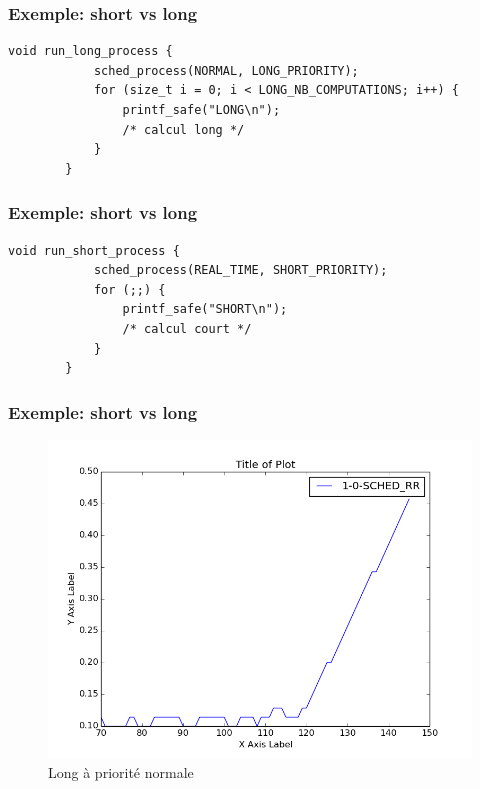\documentclass{beamer}
\begin{document}
\begin{frame}[fragile]
    \frametitle{Exemple: short vs long}

    \begin{lstlisting}[caption=processus long]
        void run_long_process {
            sched_process(NORMAL, LONG_PRIORITY);
            for (size_t i = 0; i < LONG_NB_COMPUTATIONS; i++) {
                printf_safe("LONG\n");
                /* calcul long */
            }
        }
    \end{lstlisting}
\end{frame}

\begin{frame}[fragile]
    \frametitle{Exemple: short vs long}

    \begin{lstlisting}[caption=processus court]
        void run_short_process {
            sched_process(REAL_TIME, SHORT_PRIORITY);
            for (;;) {
                printf_safe("SHORT\n");
                /* calcul court */
            }
        }
    \end{lstlisting}
\end{frame}

\begin{frame}
    \frametitle{Exemple: short vs long}

    \begin{center}
        \begin{figure}
            \includegraphics[scale=0.3]{../../short_vs_long/figures/1-0-SCHED_RR.png}
            \caption{Long à priorité normale}
        \end{figure}
    \end{center}
\end{frame}
\end{document}
